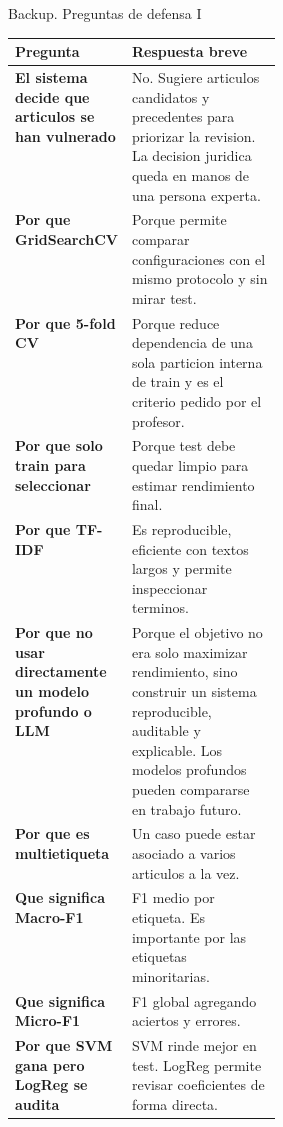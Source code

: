 \documentclass[aspectratio=169,10pt]{beamer}
\begin{document}
\begin{frame}{Backup. Preguntas de defensa I}
  \footnotesize
  \begin{tabularx}{\linewidth}{>{\bfseries}p{0.31\linewidth}X}
      \toprule
      Pregunta & Respuesta breve\\
      \midrule
      El sistema decide que articulos se han vulnerado & No. Sugiere articulos candidatos y precedentes para priorizar la revision. La decision juridica queda en manos de una persona experta.\\
      Por que GridSearchCV & Porque permite comparar configuraciones con el mismo protocolo y sin mirar test.\\
      Por que 5-fold CV & Porque reduce dependencia de una sola particion interna de train y es el criterio pedido por el profesor.\\
      Por que solo train para seleccionar & Porque test debe quedar limpio para estimar rendimiento final.\\
      Por que TF-IDF & Es reproducible, eficiente con textos largos y permite inspeccionar terminos.\\
      Por que no usar directamente un modelo profundo o LLM & Porque el objetivo no era solo maximizar rendimiento, sino construir un sistema reproducible, auditable y explicable. Los modelos profundos pueden compararse en trabajo futuro.\\
      Por que es multietiqueta & Un caso puede estar asociado a varios articulos a la vez.\\
      Que significa Macro-F1 & F1 medio por etiqueta. Es importante por las etiquetas minoritarias.\\
      Que significa Micro-F1 & F1 global agregando aciertos y errores.\\
      Por que SVM gana pero LogReg se audita & SVM rinde mejor en test. LogReg permite revisar coeficientes de forma directa.\\
      \bottomrule
  \end{tabularx}
\end{frame}
\end{document}
